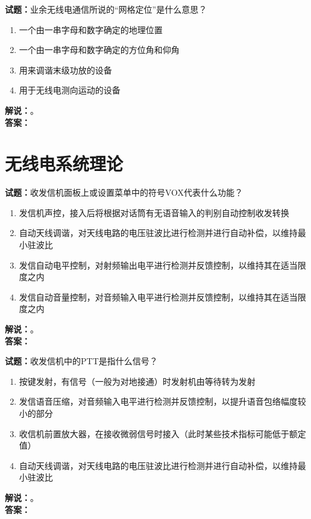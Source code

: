 \documentclass{ctexbook}
\begin{document}
\noindent\textbf{试题：}业余无线电通信所说的“网格定位”是什么意思？
\begin{enumerate}[leftmargin=3em]
  \item 一个由一串字母和数字确定的地理位置 %
  \item 一个由一串字母和数字确定的方位角和仰角
  \item 用来调谐末级功放的设备
  \item 用于无线电测向运动的设备
\end{enumerate}
\noindent\textbf{解说：}\textbf{}。\\\noindent\textbf{答案：}

\vspace{\baselineskip}



\chapter{无线电系统理论}

\newpage

\noindent\textbf{试题：}收发信机面板上或设置菜单中的符号VOX代表什么功能？
\begin{enumerate}[leftmargin=3em]
  \item 发信机声控，接入后将根据对话筒有无语音输入的判别自动控制收发转换
  \item 自动天线调谐，对天线电路的电压驻波比进行检测并进行自动补偿，以维持最小驻波比
  \item 发信自动电平控制，对射频输出电平进行检测并反馈控制，以维持其在适当限度之内
  \item 发信自动音量控制，对音频输入电平进行检测并反馈控制，以维持其在适当限度之内
\end{enumerate}
\noindent\textbf{解说：}\textbf{}。\\\noindent\textbf{答案：}

\vspace{\baselineskip}

\noindent\textbf{试题：}收发信机中的PTT是指什么信号？
\begin{enumerate}[leftmargin=3em]
  \item 按键发射，有信号（一般为对地接通）时发射机由等待转为发射
  \item 发信语音压缩，对音频输入电平进行检测并反馈控制，以提升语音包络幅度较小的部分
  \item 收信机前置放大器，在接收微弱信号时接入（此时某些技术指标可能低于额定值）
  \item 自动天线调谐，对天线电路的电压驻波比进行检测并进行自动补偿，以维持最小驻波比
\end{enumerate}
\noindent\textbf{解说：}\textbf{}。\\\noindent\textbf{答案：}
\end{document}
